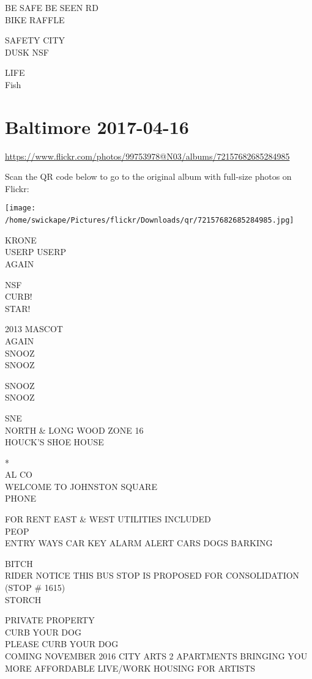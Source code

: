 \documentclass[10pt,letterpaper]{article}
\begin{document}
BE SAFE BE SEEN RD\\
BIKE RAFFLE

SAFETY CITY\\
DUSK NSF

LIFE\\
Fish
\

\section*{Baltimore 2017-04-16}

\url{https://www.flickr.com/photos/99753978@N03/albums/72157682685284985}

Scan the QR code below to go to the original album with full-size photos on Flickr:

\texttt{[image: /home/swickape/Pictures/flickr/Downloads/qr/72157682685284985.jpg]}
\

KRONE\\
USERP USERP\\
AGAIN

NSF\\
CURB!\\
STAR!

2013 MASCOT\\
AGAIN\\
SNOOZ\\
SNOOZ

SNOOZ\\
SNOOZ

SNE\\
NORTH \& LONG WOOD ZONE 16\\
HOUCK'S SHOE HOUSE

*\\
AL CO\\
WELCOME TO JOHNSTON SQUARE\\
PHONE

FOR RENT EAST \& WEST UTILITIES INCLUDED\\
PEOP\\
ENTRY WAYS CAR KEY ALARM ALERT CARS DOGS BARKING

BITCH\\
RIDER NOTICE THIS BUS STOP IS PROPOSED FOR CONSOLIDATION (STOP \# 1615)\\
STORCH

PRIVATE PROPERTY\\
CURB YOUR DOG\\
PLEASE CURB YOUR DOG\\
COMING NOVEMBER 2016 CITY ARTS 2 APARTMENTS BRINGING YOU MORE AFFORDABLE LIVE/WORK HOUSING FOR ARTISTS
\end{document}
